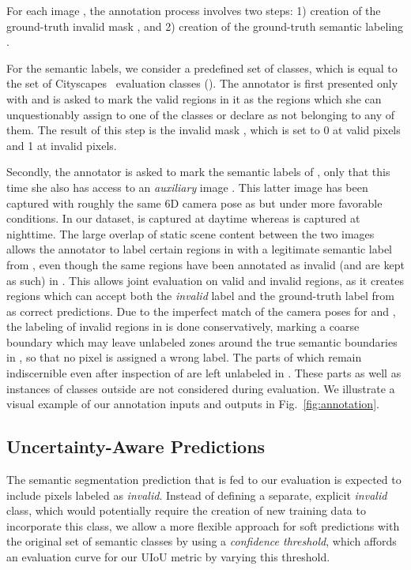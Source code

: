 \documentclass[10pt,twocolumn,letterpaper]{article}
\begin{document}
For each image , the annotation process involves two steps: 1) creation of the ground-truth invalid mask , and 2) creation of the ground-truth semantic labeling .

For the semantic labels, we consider a predefined set  of  classes, which is equal to the set of Cityscapes~\cite{Cityscapes} evaluation classes (). The annotator is first presented only with  and is asked to mark the valid regions in it as the regions which she can unquestionably assign to one of the  classes or declare as not belonging to any of them. The result of this step is the invalid mask , which is set to 0 at valid pixels and 1 at invalid pixels.

Secondly, the annotator is asked to mark the semantic labels of , only that this time she also has access to an \emph{auxiliary} image . This latter image has been captured with roughly the same 6D camera pose as  but under more favorable conditions. In our dataset,  is captured at daytime whereas  is captured at nighttime. The large overlap of static scene content between the two images allows the annotator to label certain regions in  with a legitimate semantic label from , even though the same regions have been annotated as invalid (and are kept as such) in . This allows joint evaluation on valid and invalid regions, as it creates regions which can accept both the \emph{invalid} label and the ground-truth label from  as correct predictions. Due to the imperfect match of the camera poses for  and , the labeling of invalid regions in  is done conservatively, marking a coarse boundary which may leave unlabeled zones around the true semantic boundaries in , so that no pixel is assigned a wrong label. The parts of  which remain indiscernible even after inspection of  are left unlabeled in . These parts as well as instances of classes outside  are not considered during evaluation. We illustrate a visual example of our annotation inputs and outputs in Fig.~\ref{fig:annotation}.

\subsection{Uncertainty-Aware Predictions}



The semantic segmentation prediction that is fed to our evaluation is expected to include pixels labeled as \emph{invalid}. Instead of defining a separate, explicit \emph{invalid} class, which would potentially require the creation of new training data to incorporate this class, we allow a more flexible approach for soft predictions with the original set of semantic classes by using a \emph{confidence threshold}, which affords an evaluation curve for our UIoU metric by varying this threshold.
\end{document}
